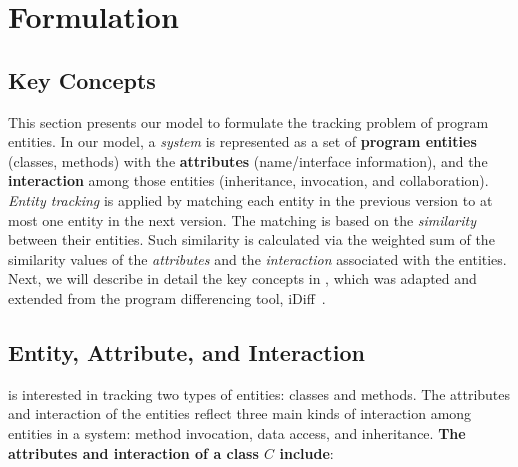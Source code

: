 \section{Formulation}
\label{model}

\subsection{Key Concepts}

This section presents our model to formulate the tracking problem of
program entities.
In our model, a \emph{system} is represented as a set of
{\bf program entities} (\eg classes, methods) with the
{\bf attributes} (\eg name/interface information), and the
{\bf interaction} among those entities (\eg inheritance, invocation,
and collaboration). \emph{Entity tracking} is applied by matching each
entity in the previous version to at most one entity in the next
version. The matching is based on the \emph{similarity} between their
entities. Such similarity is calculated via the weighted sum of the
similarity values of the {\em attributes} and the \emph{interaction}
associated with the entities. 
%
Next, we will describe in detail the key concepts in {\tool}, which
was adapted and extended from the program differencing tool,
iDiff~\cite{ase11-tool}.

%


\subsection{Entity, Attribute, and Interaction}


{\tool} is interested in tracking two types of entities: classes
and methods. The attributes
and interaction of the entities reflect three main kinds of
interaction among entities in a system: method
invocation, data access, and inheritance. {\bf The attributes
and interaction of a class $C$ include}:

